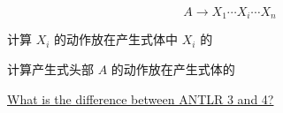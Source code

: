 \begin{frame}{}
  \begin{center}
    

    
  \end{center}
\end{frame}

\begin{frame}{}
  \begin{center}

    \[
      A \to X_{1} \cdots X_{i} \cdots X_{n}
    \]

    \vspace{0.80cm}
    计算 $X_{i}$ 的动作放在产生式体中 $X_{i}$ 的

    \vspace{0.30cm}
    计算产生式头部 $A$ 的动作放在产生式体的
  \end{center}
\end{frame}

\begin{frame}{}
  \begin{center}
    \href{https://github.com/antlr/antlr4/blob/master/doc/faq/general.md\#what-is-the-difference-between-antlr-3-and-4}{What is the difference between ANTLR 3 and 4?
}
    \vspace{0.30cm}
    \pause
  \end{center}
\end{frame}
